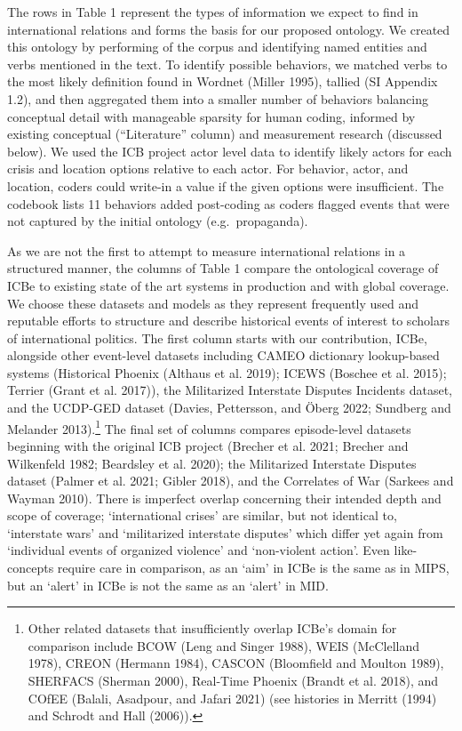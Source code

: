 \documentclass{article}
\begin{document}
The rows in Table 1 represent the types of information we expect to find
in international relations and forms the basis for our proposed
ontology. We created this ontology by performing of the corpus and
identifying named entities and verbs mentioned in the text. To identify
possible behaviors, we matched verbs to the most likely definition found
in Wordnet (Miller 1995), tallied (SI Appendix 1.2), and then aggregated
them into a smaller number of behaviors balancing conceptual detail with
manageable sparsity for human coding, informed by existing conceptual
(``Literature'' column) and measurement research (discussed below). We
used the ICB project actor level data to identify likely actors for each
crisis and location options relative to each actor. For behavior, actor,
and location, coders could write-in a value if the given options were
insufficient. The codebook lists 11 behaviors added post-coding as
coders flagged events that were not captured by the initial ontology
(e.g.~propaganda).

As we are not the first to attempt to measure international relations in
a structured manner, the columns of Table 1 compare the ontological
coverage of ICBe to existing state of the art systems in production and
with global coverage. We choose these datasets and models as they
represent frequently used and reputable efforts to structure and
describe historical events of interest to scholars of international
politics. The first column starts with our contribution, ICBe, alongside
other event-level datasets including CAMEO dictionary lookup-based
systems (Historical Phoenix (Althaus et al. 2019); ICEWS (Boschee et al.
2015); Terrier (Grant et al. 2017)), the Militarized Interstate Disputes
Incidents dataset, and the UCDP-GED dataset (Davies, Pettersson, and
Öberg 2022; Sundberg and Melander 2013).\footnote{Other related datasets
  that insufficiently overlap ICBe's domain for comparison include BCOW
  (Leng and Singer 1988), WEIS (McClelland 1978), CREON (Hermann 1984),
  CASCON (Bloomfield and Moulton 1989), SHERFACS (Sherman 2000),
  Real-Time Phoenix (Brandt et al. 2018), and COfEE (Balali, Asadpour,
  and Jafari 2021) (see histories in Merritt (1994) and Schrodt and Hall
  (2006)).} The final set of columns compares episode-level datasets
beginning with the original ICB project (Brecher et al. 2021; Brecher
and Wilkenfeld 1982; Beardsley et al. 2020); the Militarized Interstate
Disputes dataset (Palmer et al. 2021; Gibler 2018), and the Correlates
of War (Sarkees and Wayman 2010). There is imperfect overlap concerning
their intended depth and scope of coverage; `international crises' are
similar, but not identical to, `interstate wars' and `militarized
interstate disputes' which differ yet again from `individual events of
organized violence' and `non-violent action'. Even like-concepts require
care in comparison, as an `aim' in ICBe is the same as in MIPS, but an
`alert' in ICBe is not the same as an `alert' in MID.
\end{document}
